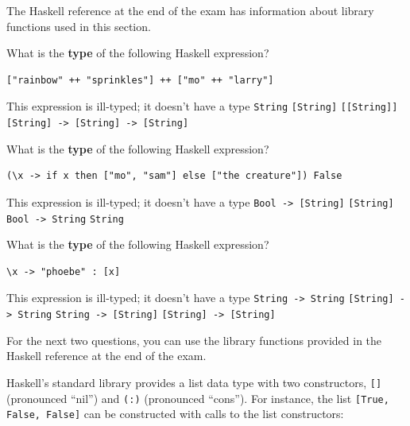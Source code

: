 \documentclass[addpoints]{exam}
\begin{document}
\begin{questions}
The Haskell reference at the end of the exam has information about library functions used in this section.

\question[6] What is the \textbf{type} of the following Haskell expression?

\begin{verbatim}
["rainbow" ++ "sprinkles"] ++ ["mo" ++ "larry"]
\end{verbatim}

\begin{checkboxes}
  \choice This expression is ill-typed; it doesn't have a type
  \choice \verb|String|
  \CorrectChoice \verb|[String]|
  \choice \verb|[[String]]|
  \choice \verb|[String] -> [String] -> [String]|
\end{checkboxes}

\question[6] What is the \textbf{type} of the following Haskell expression?

\begin{verbatim}
(\x -> if x then ["mo", "sam"] else ["the creature"]) False
\end{verbatim}

\begin{checkboxes}
  \choice This expression is ill-typed; it doesn't have a type
  \choice \verb|Bool -> [String]|
  \CorrectChoice \verb|[String]|
  \choice \verb|Bool -> String|
  \choice \verb|String|
\end{checkboxes}

\question[6] What is the \textbf{type} of the following Haskell expression?

\begin{verbatim}
\x -> "phoebe" : [x]
\end{verbatim}

\begin{checkboxes}
  \choice This expression is ill-typed; it doesn't have a type
  \choice \verb|String -> String|
  \choice \verb|[String] -> String|
  \CorrectChoice \verb|String -> [String]|
  \choice \verb|[String] -> [String]|
\end{checkboxes}

\newpage

For the next two questions, you can use the library functions provided in the Haskell reference at the end of the exam.

Haskell's standard library provides a list data type with two constructors, \verb|[]| (pronounced ``nil'') and \verb|(:)| (pronounced ``cons'').  For instance, the list \verb|[True, False, False]| can be constructed with calls to the list constructors:


\end{questions}
\end{document}
